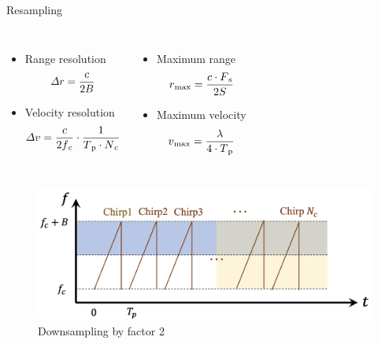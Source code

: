 \documentclass{beamer}
\begin{document}
\begin{frame}[t]{Resampling}
    \vspace{-1.5\baselineskip}
    \begin{columns}[t]
        \begin{itemize}
            \item Range resolution
                \begin{equation}
                    \centering
                    \Delta r = \frac{c}{2B}
                \end{equation}
            \item Velocity resolution
                \begin{equation}
                    \centering
                    \Delta v = \frac{c}{2f\textsubscript{c}} \cdot \frac{1}{T\textsubscript{p} \cdot N\textsubscript{c}}
                \end{equation}
		\end{itemize}
		\begin{itemize}
			\item Maximum range
                \begin{equation}
                    \centering
                    r\textsubscript{max} = \frac{c \cdot F\textsubscript{s}}{2S}
                \end{equation}
			\item Maximum velocity
                \begin{equation}
                    \centering
                    v\textsubscript{max} = \frac{\lambda}{4 \cdot T\textsubscript{p}}
                \end{equation}
		\end{itemize}
	\end{columns}


    \begin{figure}
        \centering
        \includegraphics[scale=.4]{MA_presentation/figures/resampling.png}
        \vspace{-0.5ex}
        \caption{Downsampling by factor 2}
    \end{figure}

\end{frame}
\end{document}
